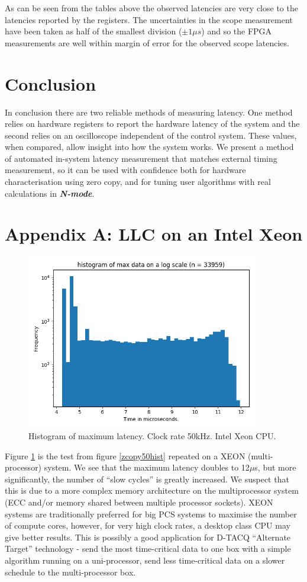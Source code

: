 \documentclass{article}
\begin{document}
As can be seen from the tables above the observed latencies are very close to the latencies reported by the registers.
The uncertainties in the scope measurement have been taken as half of the smallest division ($\pm 1 \mu s$) and so the FPGA measurements are well within margin of error for the observed scope latencies.

\section{Conclusion} \label{conc}
In conclusion there are two reliable methods of measuring latency.
One method relies on hardware registers to report the hardware latency of the system and the second relies on an oscilloscope independent of the control system.
These values, when compared, allow insight into how the system works.
We present a method of automated in-system latency measurement that matches external timing measurement, so it can be used with confidence both for hardware characterisation using zero copy, and for tuning user algorithms with real calculations in \textit{\textbf{N-mode}}.

\newpage

\section{Appendix A: LLC on an Intel Xeon} \label{xeon}

\begin{figure}[!htb]
	\centering
	\includegraphics[width=4.0in]{images/50kHz_xeon.png}
	\caption{Histogram of maximum latency. Clock rate 50kHz. Intel Xeon CPU.}
	\label{xeon50}
\end{figure}

Figure \ref{xeon50} is the test from figure \ref{zcopy50hist} repeated on a XEON (multi-processor) system.
We see that the maximum latency doubles to 12$\mu$s, but more significantly, the number of “slow cycles” is greatly increased.
We suspect that this is due to a more complex memory architecture on the multiprocessor system (ECC and/or memory shared between multiple processor sockets).
XEON systems are traditionally preferred for big PCS systems to maximise the number of compute cores, however, for very high clock rates, a desktop class CPU may give better results.
This is possibly a good application for \mbox{D-TACQ} “Alternate Target” technology - send the most time-critical data to one box with a simple algorithm running on a uni-processor, send less time-critical data on a slower schedule to the multi-processor box.
\end{document}
